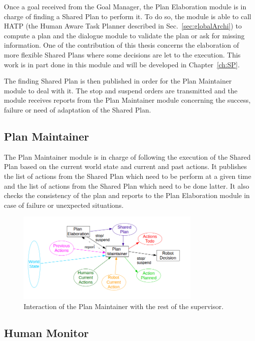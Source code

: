 \documentclass[english,a4paper,11pt,twoside]{StyleThese}
\begin{document}
Once a goal received from the Goal Manager, the Plan Elaboration module is in charge of finding a Shared Plan to perform it. To do so, the module is able to call HATP (the Human Aware Task Planner described in Sec.~\ref{sec:globalArchi}) to compute a plan and the dialogue module to validate the plan or ask for missing information. One of the contribution of this thesis concerns the elaboration of more flexible Shared Plans where some decisions are let to the execution. This work is in part done in this module and will be developed in Chapter~\ref{ch:SP}.

The finding Shared Plan is then published in order for the Plan Maintainer module to deal with it. The stop and suspend orders are transmitted and the module receives reports from the Plan Maintainer module concerning the success, failure or need of adaptation of the Shared Plan.

\subsection{Plan Maintainer}

The Plan Maintainer module is in charge of following the execution of the Shared Plan based on the current world state and current and past actions. It publishes the list of actions from the Shared Plan which need to be perform at a given time and the list of actions from the Shared Plan which need to be done latter. It also checks the consistency of the plan and reports to the Plan Elaboration module in case of failure or unexpected situations.

\begin{figure}[!h]
	\centering
    \includegraphics[width=0.8\textwidth]{figs/Chapter2/PlanMaintainer.png}
    \caption{Interaction of the Plan Maintainer with the rest of the supervisor.}
    \label{fig:planMaintainer}
\end{figure}

\subsection{Human Monitor}
\end{document}
